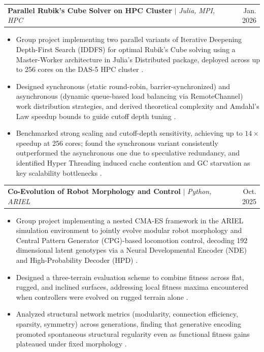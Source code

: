 \documentclass[letterpaper,11pt]{article}
\makeatletter
\newcommand{\resumeItem}[1]{
  \item\small{
    {#1 \vspace{-2pt}}
  }
}
\newcommand{\resumeProjectHeading}[2]{
    \item
    \begin{tabular*}{0.97\textwidth}{l@{\extracolsep{\fill}}r}
      \small#1 & #2 \\
    \end{tabular*}\vspace{-7pt}
}
\newcommand{\resumeItemListStart}{\begin{itemize}}
\newcommand{\resumeItemListEnd}{\end{itemize}\vspace{-5pt}}
\makeatother
\begin{document}
      \resumeProjectHeading
          {\textbf{Parallel Rubik's Cube Solver on HPC Cluster} $|$ \emph{Julia, MPI, HPC}}{Jan. 2026}
          \resumeItemListStart
            \resumeItem{Group project implementing two parallel variants of Iterative Deepening Depth-First Search (IDDFS) for optimal Rubik's Cube solving using a Master-Worker architecture in Julia's Distributed package, deployed across up to 256 cores on the DAS-5 HPC cluster .}
            \resumeItem{Designed synchronous (static round-robin, barrier-synchronized) and asynchronous (dynamic queue-based load balancing via RemoteChannel) work distribution strategies, and derived theoretical complexity and Amdahl's Law speedup bounds to guide cutoff depth tuning .}
            \resumeItem{Benchmarked strong scaling and cutoff-depth sensitivity, achieving up to $14\times$ speedup at 256 cores; found the synchronous variant consistently outperformed the asynchronous one due to speculative redundancy, and identified Hyper Threading induced cache contention and GC starvation as key scalability bottlenecks .}
          \resumeItemListEnd
      \resumeProjectHeading
          {\textbf{Co-Evolution of Robot Morphology and Control} $|$ \emph{Python, ARIEL}}{Oct. 2025}
          \resumeItemListStart
            \resumeItem{Group project implementing a nested CMA-ES framework in the ARIEL simulation environment to jointly evolve modular robot morphology and Central Pattern Generator (CPG)-based locomotion control, decoding 192 dimensional latent genotypes via a Neural Developmental Encoder (NDE) and High-Probability Decoder (HPD) .}
            \resumeItem{Designed a three-terrain evaluation scheme to combine fitness across flat, rugged, and inclined surfaces, addressing local fitness maxima encountered when controllers were evolved on rugged terrain alone .}
            \resumeItem{Analyzed structural network metrics (modularity, connection efficiency, sparsity, symmetry) across generations, finding that generative encoding promoted spontaneous structural regularity even as functional fitness gains plateaued under fixed morphology .}
          \resumeItemListEnd
\end{document}
